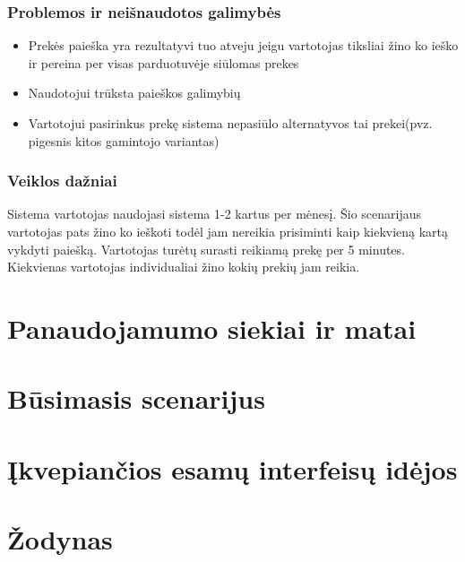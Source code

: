 \documentclass[oneside]{VUMIFPSkursinis}
\begin{document}
	\subsubsection{Problemos ir neišnaudotos galimybės}
		\begin{itemize}
			\item{Prekės paieška yra rezultatyvi tuo atveju jeigu vartotojas tiksliai žino ko ieško ir pereina per visas parduotuvėje siūlomas prekes}
			\item{Naudotojui trūksta paieškos galimybių}
			\item{Vartotojui pasirinkus prekę sistema nepasiūlo alternatyvos tai prekei(pvz. pigesnis kitos gamintojo variantas)}
		\end{itemize}
	\subsubsection{Veiklos dažniai}
		Sistema vartotojas naudojasi sistema 1-2 kartus per mėnesį.
		Šio scenarijaus vartotojas pats žino ko ieškoti todėl jam nereikia prisiminti kaip kiekvieną kartą vykdyti paiešką.
		Vartotojas turėtų surasti reikiamą prekę per 5 minutes.
		Kiekvienas vartotojas individualiai žino kokių prekių jam reikia.

\section{Panaudojamumo siekiai ir matai}

\section{Būsimasis scenarijus}

\section{Įkvepiančios esamų interfeisų idėjos}

\section{Žodynas}
\end{document}
